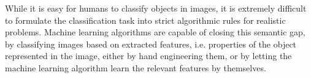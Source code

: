 
While it is easy for humans to classify objects in images, it is extremely difficult to formulate the classification task into strict algorithmic rules for realistic problems. Machine learning algorithms are capable of closing this semantic gap, by classifying images based on extracted features, i.e. properties of the object represented in the image, either by hand engineering them, or by letting the machine learning algorithm learn the relevant features by themselves. \\




